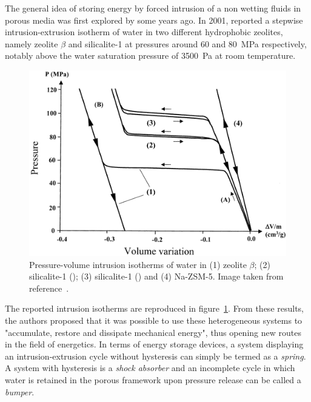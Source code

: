 \documentclass[thesis]{subfiles}
\begin{document}
The general idea of storing energy by forced intrusion of a non wetting fluids
in porous media was first explored by \citeauthor{Fadeev1997} some years
ago\cite{Fadeev1997}. In 2001, \citeauthor{Eroshenko2001}\cite{Eroshenko2001}
reported a stepwise intrusion-extrusion isotherm of water in two different
hydrophobic zeolites, namely zeolite $\beta$ and silicalite-1 at pressures
around 60 and \SI{80}{MPa} respectively, \ie notably above the water saturation
pressure of \SI{3 500}{Pa} at room temperature.

\begin{figure}[ht]
    \centering
    \includegraphics[width=0.6\linewidth]{figures/cited/intrusion-zeosil}
    \caption{Pressure-volume intrusion isotherms of water in (1) zeolite
    $\beta$; (2) silicalite-1 (); (3) silicalite-1 () and (4)
    Na-ZSM-5. Image taken from reference~\cite{Eroshenko2001}.}
    \label{fig:intrusion-zeosil}
\end{figure}

The reported intrusion isotherms are reproduced in
figure~\ref{fig:intrusion-zeosil}. From these results, the authors proposed that
it was possible to use these heterogeneous systems to "accumulate, restore and
dissipate mechanical energy", thus opening new routes in the field of
energetics. In terms of energy storage devices, a system displaying an
intrusion-extrusion cycle without hysteresis can simply be termed as a
\emph{spring}. A system with hysteresis is a \emph{shock absorber} and an
incomplete cycle in which water is retained in the porous framework upon
pressure release can be called a \emph{bumper}.
\end{document}
